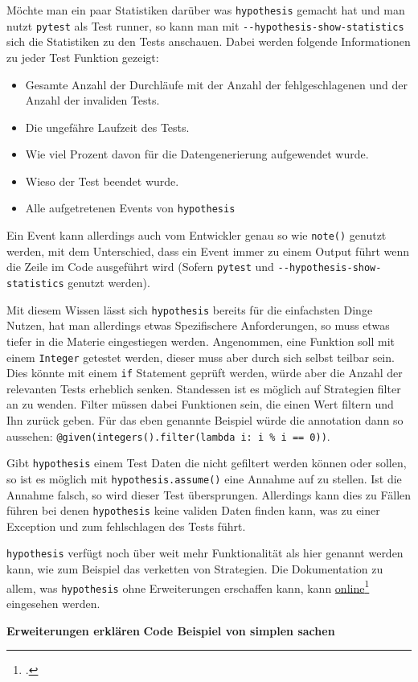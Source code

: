 Möchte man ein paar Statistiken darüber was \lstinline{hypothesis} gemacht hat und man
nutzt \lstinline{pytest} als Test runner, so kann man mit \lstinline{--hypothesis-show-statistics}
sich die Statistiken zu den Tests anschauen. Dabei werden folgende Informationen 
zu jeder Test Funktion gezeigt:
\begin{itemize}
    \item Gesamte Anzahl der Durchläufe mit der Anzahl der fehlgeschlagenen und der Anzahl der invaliden Tests.
    \item Die ungefähre Laufzeit des Tests.
    \item Wie viel Prozent davon für die Datengenerierung aufgewendet wurde.
    \item Wieso der Test beendet wurde.
    \item Alle aufgetretenen Events von \lstinline{hypothesis}
\end{itemize}

Ein Event kann allerdings auch vom Entwickler genau so wie \lstinline{note()} genutzt
werden, mit dem Unterschied, dass ein Event immer zu einem Output führt wenn die
Zeile im Code ausgeführt wird (Sofern \lstinline{pytest} und
\lstinline{--hypothesis-show-statistics} genutzt werden).

Mit diesem Wissen lässt sich \lstinline{hypothesis} bereits für die einfachsten Dinge
Nutzen, hat man allerdings etwas Spezifischere Anforderungen, so muss etwas tiefer
in die Materie eingestiegen werden. Angenommen, eine Funktion soll mit einem
\lstinline{Integer} getestet werden, dieser muss aber durch sich selbst teilbar sein.
Dies könnte mit einem \lstinline{if} Statement geprüft werden, würde aber die Anzahl
der relevanten Tests erheblich senken. Standessen ist es möglich auf Strategien filter
an zu wenden. Filter müssen dabei Funktionen sein, die einen Wert filtern und Ihn zurück
geben. Für das eben genannte Beispiel würde die \Gls{annotation} dann so aussehen:
\lstinline{@given(integers().filter(lambda i: i % i == 0))}.

Gibt \lstinline{hypothesis} einem Test Daten die nicht gefiltert werden können oder sollen,
so ist es möglich mit \lstinline{hypothesis.assume()} eine Annahme auf zu stellen. Ist die
Annahme falsch, so wird dieser Test übersprungen. Allerdings kann dies zu Fällen führen bei
denen \lstinline{hypothesis} keine validen Daten finden kann, was zu einer Exception und
zum fehlschlagen des Tests führt.

\lstinline{hypothesis} verfügt noch über weit mehr Funktionalität als hier genannt werden kann,
wie zum Beispiel das verketten von Strategien. Die Dokumentation zu allem, was
\lstinline{hypothesis} ohne Erweiterungen erschaffen kann, kann
\href{https://hypothesis.readthedocs.io/en/latest/data.html}{online}\footcite{https://hypothesis.readthedocs.io/en/latest/data.html}
eingesehen werden.

\textbf{Erweiterungen erklären}
\textbf{Code Beispiel von simplen sachen}